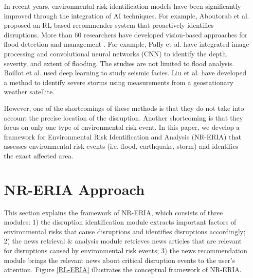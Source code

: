 \documentclass[]{ceurart}
\begin{document}
In recent years, environmental risk identification models have been significantly improved through the integration of AI techniques. For example, Aboutorab et al. \cite{aboutorab2021reinforcement} proposed an RL-based recommender system that proactively identifies disruptions. More than 60 researchers have developed vision-based approaches for flood detection and management \cite{munawar2021review}. For example, Pally et al. \cite{pally2022application} have integrated image processing and convolutional neural networks (CNN) to identify the depth, severity, and extent of flooding. The studies are not limited to flood analysis. Boillot et al. \cite{boillot2021deep} used deep learning to study seismic facies. Liu et al. \cite{liu2019local} have developed a method to identify severe storms using measurements from a geostationary weather satellite. 

However, one of the shortcomings of these methods is that they do not take into account the precise location of the disruption. Another shortcoming is that they focus on only one type of environmental risk event. In this paper, we develop a framework for Environmental Risk Identification and Analysis (NR-ERIA) that assesses environmental risk events (i.e. flood, earthquake, storm) and identifies the exact affected area.

\section{NR-ERIA Approach}\label{3}

This section explains the framework of NR-ERIA, which consists of three modules: 1) the disruption identification module extracts important factors of environmental risks that cause disruptions and identifies disruptions accordingly; 2) the news retrieval \& analysis module retrieves news articles that are relevant for disruptions caused by environmental risk events; 3) the news recommendation module brings the relevant news about critical disruption events to the user's attention. Figure \ref{RL-ERIA} illustrates the conceptual framework of NR-ERIA.
\end{document}
